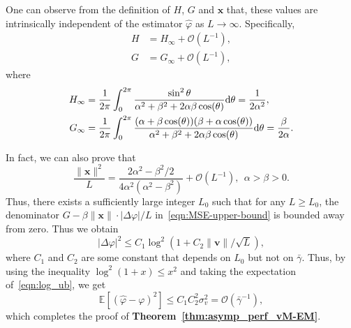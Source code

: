 \documentclass[a4paper,12pt]{article}
\begin{document}
One can observe from the definition of $H$, $G$ and $\bm x$ that, these values are intrinsically independent of the estimator $\hat{\varphi}$ as $L\to\infty$. Specifically, 
\begin{equation}
    \begin{aligned}
        H &= H_{\infty} + \mathcal{O}(L^{-1}), \\
        G &= G_{\infty} + \mathcal{O}(L^{-1}), 
    \end{aligned}
\end{equation}
where 
\begin{equation}
    \begin{aligned}
        H_{\infty} &=  \frac{1}{2\pi}\int_{0}^{2\pi} \frac{\sin^2\theta}{\alpha^2+\beta^2+2\alpha\beta\cos(\theta)}{\rm d}\theta = \frac{1}{2\alpha^2},  \\
        G_{\infty} &= \frac{1}{2\pi}\int_{0}^{2\pi} \frac{(\alpha+\beta\cos(\theta))(\beta+\alpha\cos(\theta))}{\alpha^2+\beta^2+2\alpha\beta\cos(\theta)} {\rm d}\theta = \frac{\beta}{2\alpha}.  \\ 
    \end{aligned}
\end{equation}

In fact, we can also prove that 
\begin{equation}
    \frac{\|{\bm x}\|^2}{L} = \frac{2\alpha^2-\beta^2/2}{4\alpha^2(\alpha^2-\beta^2)} + \mathcal{O}(L^{-1}),~~\alpha>\beta>0. 
\end{equation}
Thus, there exists a sufficiently large integer $L_0$ such that for any $L\geq L_0$, the denominator $G-\beta\|{\bm x}\| \cdot |\Delta\varphi|/L$ in~\eqref{eqn:MSE-upper-bound} is bounded away from zero. Thus we obtain 
\begin{equation}
    |\Delta\varphi|^2 \leq C_1 \log^2(1+C_2\|{\bm v}\|/\sqrt{L}),
    \label{eqn:log_ub}
\end{equation}
where $C_1$ and $C_2$ are some constant that depends on $L_0$ but not on $\bar{\gamma}$. Thus, by using the inequality $\log^2(1+x)\leq x^2$ and taking the expectation of~\eqref{eqn:log_ub}, we get 
\begin{equation}
    \mathbb{E}[(\hat{\varphi} - \varphi)^2]\leq C_1 C_2^2 \sigma_v^2 = \mathcal{O}(\bar{\gamma}^{-1}),
\end{equation}
which completes the proof of {\bf Theorem~\ref{thm:asymp_perf_vM-EM}}. 


\appendix
\end{document}
